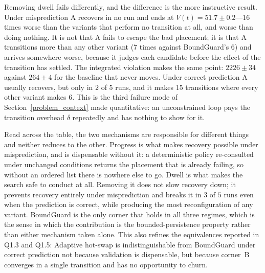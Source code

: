 \documentclass[conference]{IEEEtran}
\begin{document}
{{Removing dwell fails differently, and the difference is the more instructive result. Under misprediction A recovers in no run and ends at $V(t)=51.7\pm0.2$---$16$ times worse than the variants that perform no transition at all, and worse than doing nothing. It is not that A fails to escape the bad placement; it is that A transitions more than any other variant ($7$ times against BoundGuard's $6$) and arrives somewhere worse, because it judges each candidate before the effect of the transition has settled. The integrated violation makes the same point: $2226\pm34$ against $264\pm4$ for the baseline that never moves. Under correct prediction A usually recovers, but only in $2$ of $5$ runs, and it makes $15$ transitions where every other variant makes $6$. This is the third failure mode of Section~\ref{problem_context} made quantitative: an unconstrained loop pays the transition overhead $\delta$ repeatedly and has nothing to show for it.

Read across the table, the two mechanisms are responsible for different things and neither reduces to the other. Progress is what makes recovery possible under misprediction, and is dispensable without it: a deterministic policy re-consulted under unchanged conditions returns the placement that is already failing, so without an ordered list there is nowhere else to go. Dwell is what makes the search safe to conduct at all. Removing it does not slow recovery down; it prevents recovery entirely under misprediction and breaks it in $3$ of $5$ runs even when the prediction is correct, while producing the most reconfiguration of any variant. BoundGuard is the only corner that holds in all three regimes, which is the sense in which the contribution is the bounded-persistence property rather than either mechanism taken alone. This also refines the equivalences reported in Q1.3 and Q1.5: Adaptive hot-swap is indistinguishable from BoundGuard under correct prediction not because validation is dispensable, but because corner~B converges in a single transition and has no opportunity to churn.

}}
\end{document}
